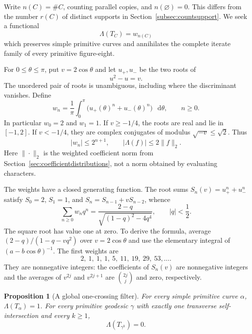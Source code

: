 \documentclass[11pt,a4paper]{article}
\numberwithin{equation}{section}
\newtheorem{proposition}[theorem]{Proposition}
\theoremstyle{definition}
\theoremstyle{remark}
\newcommand{\dd}{\mathop{}\!\mathrm d}
\begin{document}
Write $n(C)=\#C$, counting parallel copies, and $n(\varnothing)=0$.
This differs from the number $r(C)$ of distinct supports in
Section~\ref{subsec:countsupport}. We seek a functional
\[
 \Lambda(T_C)=w_{n(C)}
\]
which preserves simple primitive curves and annihilates the complete
iterate family of every primitive figure-eight.

For $0\leq\theta\leq\pi$, put $v=2\cos\theta$ and let
$u_+,u_-$ be the two roots of
\[
 u^2-u=v.
\]
The unordered pair of roots is unambiguous, including where the
discriminant vanishes. Define
\begin{equation}
 w_n=\frac1\pi\int_0^\pi
       \bigl(u_+(\theta)^n+u_-(\theta)^n\bigr)\,\dd\theta,
 \qquad n\geq0.
 \label{eq:globalmoments}
\end{equation}
In particular $w_0=2$ and $w_1=1$. If $v\geq-1/4$, the roots are
real and lie in $[-1,2]$. If $v<-1/4$, they are complex conjugates
of modulus $\sqrt{-v}\leq\sqrt2$. Thus
\begin{equation}
 |w_n|\leq2^{n+1},\qquad
 |\Lambda(f)|\leq2\|f\|_2.
 \label{eq:globalbounded}
\end{equation}
Here $\|\cdot\|_2$ is the weighted coefficient norm from
Section~\ref{sec:coefficientdistributions}, not a norm obtained
by evaluating characters.

The weights have a closed generating function. The root sums
$S_n(v)=u_+^n+u_-^n$ satisfy
$S_0=2$, $S_1=1$, and $S_n=S_{n-1}+vS_{n-2}$, whence
\begin{equation}
 \boxed{\quad
 \sum_{n\geq0}w_n q^n
 =\frac{2-q}{\sqrt{(1-q)^2-4q^4}},
 \qquad |q|<\frac12.
 \quad}
 \label{eq:globalweightseries}
\end{equation}
The square root has value one at zero. To derive the formula,
average $(2-q)/(1-q-vq^2)$ over $v=2\cos\theta$ and use the
elementary integral of $(a-b\cos\theta)^{-1}$.
The first weights are
\[
 2,\ 1,\ 1,\ 1,\ 5,\ 11,\ 19,\ 29,\ 53,\ldots.
\]
They are nonnegative integers: the coefficients of $S_n(v)$ are
nonnegative integers and the averages of $v^{2j}$ and $v^{2j+1}$
are $\binom{2j}{j}$ and zero, respectively.

\begin{proposition}[A global one-crossing filter]
\label{prop:globalonecrossing}
For every simple primitive curve $\alpha$,
$\Lambda(T_\alpha)=1$. For every primitive geodesic $\gamma$
with exactly one transverse self-intersection and every $k\geq1$,
\begin{equation}
 \boxed{\Lambda(T_{\gamma^k})=0.}
 \label{eq:globalonecrossing}
\end{equation}
\end{proposition}
\end{document}
